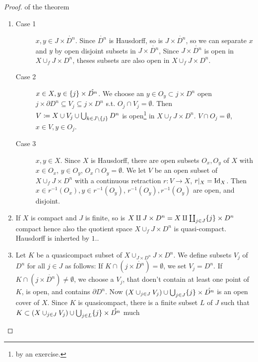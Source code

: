\documentclass{TemplateLecture}
\begin{document}
\begin{proof}of the theorem
    \begin{enumerate}
        \item \begin{description}
            \item[Case 1] \(x,y \in J\times \mathring{D^n}\). Since \(\mathring{D^n}\) is Hausdorff, so is \(J\times \mathring{D^n}\), so we can separate \(x\) and \(y\) by open disjoint subsets in \(J\times \mathring{D^n}\), Since \(J\times \mathring{D^n}\) is open in \(X \cup_f J\times D^n\), theses subsets are also open in \(X\cup_f J\times D^n\).
            \item[Case 2] \(x\in X, y \in \{j\} \times \mathring{D^n}\). We choose an \(y \in O_y \subset j \times D^n\) open \(j \times \partial D^n \subseteq V_j \subseteq j\times D^n\) s.t. \(O_j \cap V_j = \emptyset\).
            Then \(V\coloneq X\cup V_j \cup \bigcup_{k \in J\setminus\{j\}} D^n\) is open\footnote{by an exercise.} in \(X \cup_f J \times D^n\). \(V \cap O_j = \emptyset\), \(x \in V, y \in O_j\).
            \item[Case 3] \(x,y \in X\). Since \(X\) is Hausdorff, there are open subsets \(O_x, O_y\) of \(X\) with \(x \in O_x\), \(y \in O_y\), \(O_x \cap O_y = \emptyset\).
            We let \(V\) be an open subset of \(X \cup_f J \times D^n\) with a continuous retraction \(r\colon V\to X\), \(r\rvert_X = \mathrm{Id}_X\). Then \(x \in r^{-1}(O_x), y \in r^{-1}(O_y)\), \(r^{-1}(O_y), r^{-1}(O_y)\) are open, and disjoint.
        \end{description}
        \item If \(X\) is compact and \(J\) is finite, so is \(X\amalg J\times D^n = X \amalg \coprod_{j \in J} \{j\} \times D^n\) compact hence also the quotient space \(X \cup_f J\times D^n\) is quasi-compact. Hausdorff is inherted by \(1.\).
        \item Let \(K\) be a quasicompact subset of \(X \cup_{J\times D^n} J\times D^n\). We define subsets \(V_j\) of \(D^n\) for all \(j \in J\) as follows: If \(K \cap (j \times \mathring{D^n}) = \emptyset\), we set \(V_j = D^n\). If \(K \cap (j\times \mathring{D^n}) \neq \emptyset\), we choose a \(V_j\), that doen't contain at least one point of \(K\), is open, and contains \(\partial D^n\). Now \((X\cup_{j \in J} V_j) \cup \bigcup_{j \in J} \{j\} \times \mathring{D^n}\) is an open cover of \(X\). Since \(K\) is quasicompact, there is a finite subset \(L\) of \(J\) such that \(K \subset (X\cup_{j \in J} V_j) \cup \bigcup_{j \in L} \{j\} \times \mathring{D^n}\) much 
    \end{enumerate}
\end{proof}
\end{document}
